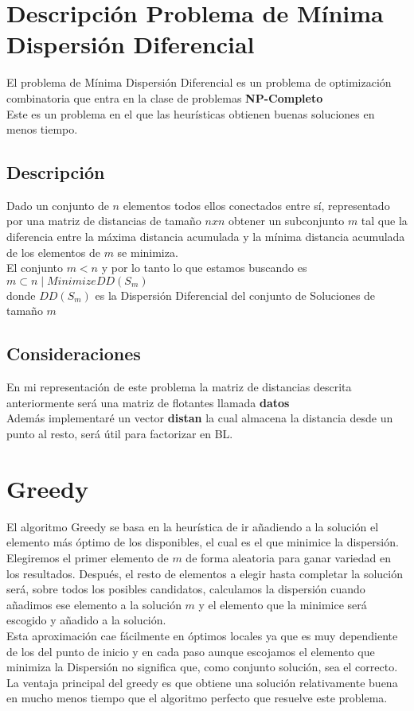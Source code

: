 \section{Descripción Problema de Mínima Dispersión Diferencial}
El problema de Mínima Dispersión Diferencial es un problema de optimización combinatoria que entra en la clase de problemas
\textbf{NP-Completo}\\
Este es un problema en el que las heurísticas obtienen buenas soluciones en menos tiempo.
 
\subsection{Descripción}
Dado un conjunto de $n$ elementos todos ellos conectados entre sí, representado por una matriz de distancias de tamaño $nxn$
obtener un subconjunto $m$ tal que la diferencia entre la máxima distancia acumulada y la mínima distancia acumulada de los elementos de $m$
se minimiza.\\
El conjunto $m < n$ y por lo tanto lo que estamos buscando es
$ m \subset n \mid Minimize DD(S_m) $\\
donde $DD(S_m) $ es la Dispersión Diferencial del conjunto de Soluciones de tamaño $m$\\
\subsection{Consideraciones}
En mi representación de este problema la matriz de distancias descrita anteriormente será una matriz de flotantes llamada \textbf{datos}\\
 
 
Además implementaré un vector \textbf{distan} la cual almacena la distancia desde un punto al resto, será útil para factorizar en BL.\\
 
\section{Greedy}
El algoritmo Greedy se basa en la heurística de ir añadiendo a la solución el elemento más óptimo de los disponibles, el cual es el que minimice la dispersión.\\
Elegiremos el primer elemento de $m$ de forma aleatoria para ganar variedad en los resultados.\newline
Después, el resto de elementos a elegir hasta completar la solución será, sobre todos los posibles candidatos,
calculamos la dispersión cuando añadimos ese elemento a la solución $m$ y
el elemento que la minimice será escogido y añadido a la solución.\\
Esta aproximación cae fácilmente en óptimos locales ya que es muy dependiente de los del punto de inicio y en cada paso aunque escojamos
el elemento que minimiza la Dispersión no significa que, como conjunto solución, sea el correcto.\\
La ventaja principal del greedy es que obtiene una solución relativamente buena en mucho menos tiempo que el algoritmo perfecto que resuelve este problema.
 
